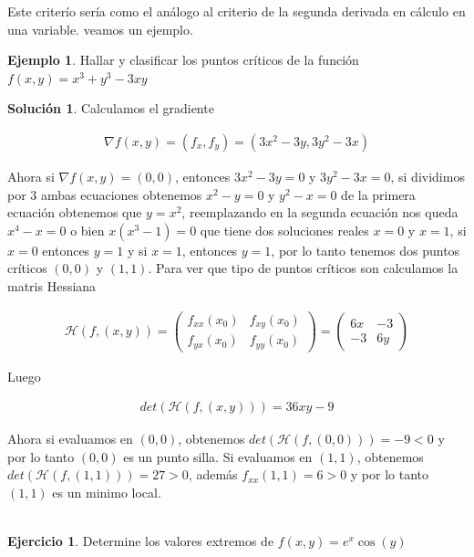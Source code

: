 \documentclass{article}
\theoremstyle{plain}
\theoremstyle{definition}
\newtheorem{ejem}[thm]{Ejemplo}
\newtheorem{ejer}[thm]{Ejercicio}
\newtheorem{sol}[thm]{Solución}
\begin{document}
Este criterío sería como el análogo al criterio de la segunda derivada en cálculo en una variable. veamos un ejemplo.\\

\begin{ejem}Hallar y clasificar los puntos críticos de la función $f(x,y) =x^3+y^3-3xy$ \\
\end{ejem}

\begin{sol}Calculamos el gradiente
\end{sol}

\begin{align*}
    \nabla f (x,y) = (f_x,f_y) = (3x^2-3y,3y^2-3x)
\end{align*}

Ahora si $\nabla f (x,y)=(0,0)$, entonces $3x^2-3y=0$ y $3y^2-3x=0$, si dividimos por $3$ ambas ecuaciones obtenemos  $x^2-y=0$ y $y^2-x=0$ de la primera ecuación obtenemos que $y=x^2$, reemplazando en la segunda ecuación nos queda $x^4-x=0$ o bien $x(x^3-1)=0$ que tiene dos soluciones reales $x=0$ y $x=1$, si $x=0$ entonces $y=1$ y si $x=1$, entonces $y=1$, por lo tanto tenemos dos puntos críticos $(0,0)$ y $(1,1)$. Para ver que tipo de puntos críticos son calculamos la matris Hessiana


\begin{align*}
    \mathcal{H}(f,(x,y)) = \begin{pmatrix}
        f_{xx}(x_0) & f_{xy}(x_0) \\
        f_{yx}(x_0) & f_{yy}(x_0)
    \end{pmatrix} = \begin{pmatrix}
        6x & -3 \\
        -3 & 6y
    \end{pmatrix}
\end{align*}

Luego

\begin{align*}
    det(\mathcal{H}(f,(x,y))) = 36xy-9
\end{align*}

Ahora si evaluamos en $(0,0)$, obtenemos $det(\mathcal{H}(f,(0,0))) =-9 < 0$ y por lo tanto $(0,0)$ es un punto silla. Si evaluamos en $(1,1)$, obtenemos $det(\mathcal{H}(f,(1,1))) =27 > 0$, además $f_{xx}(1,1)= 6 > 0$ y por lo tanto $(1,1)$ es un minimo local. \\ \\


\begin{ejer}Determine los valores extremos de $f(x,y) = e^x\cos(y)$ \\
\end{ejer}
\end{document}

